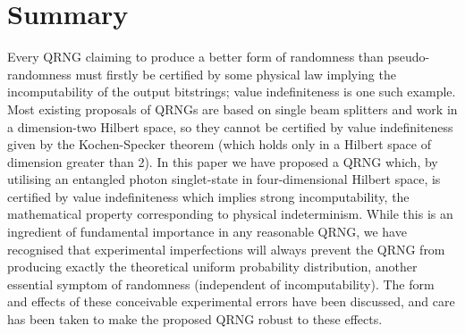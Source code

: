 \documentclass{mscs}
\begin{document}


\section{Summary}

Every QRNG  claiming to produce a better form of randomness than pseudo-randomness must firstly be certified by some physical law implying the incomputability of the output bitstrings; value indefiniteness is one such example. Most existing proposals of QRNGs are based on single beam splitters and work in a dimension-two Hilbert space, so they cannot be certified by value indefiniteness given by  the Kochen-Specker theorem (which holds only in a Hilbert space of dimension greater than 2).
In this paper we have proposed a QRNG which, by  utilising an entangled photon singlet-state in four-dimensional Hilbert space, is certified by value indefiniteness which implies strong incomputability, the mathematical property corresponding to physical indeterminism. While this is an ingredient of fundamental importance in any reasonable QRNG, we have recognised that experimental imperfections will always prevent the QRNG from producing exactly the theoretical uniform probability distribution, another essential symptom of randomness (independent of incomputability). The form and effects of these conceivable experimental errors have been discussed, and care has been taken to make the proposed QRNG robust to these effects.
\end{document}
